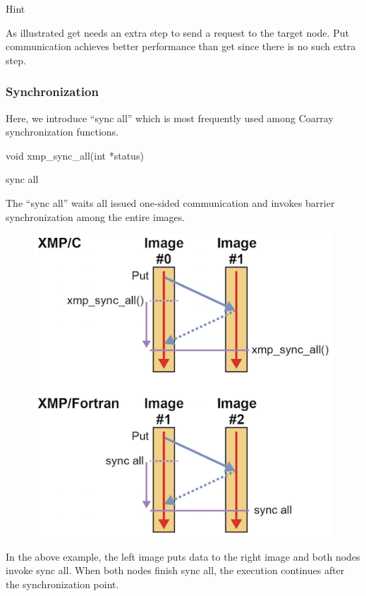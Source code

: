 Hint

As illustrated get needs an extra step to send a request to the target
node. Put communication achieves better performance than get since there
is no such extra step.

\subsubsection{Synchronization}

Here, we introduce “sync all” which is most frequently used among
Coarray synchronization functions.

\begin{XCexample}
void xmp_sync_all(int *status)
\end{XCexample}

\begin{XFexample}
sync all
\end{XFexample}

The “sync all” waits all issued one-sided communication and invokes
barrier synchronization among the entire images.

\begin{figure}
  \centering
  \includegraphics{figs/sync_all.png}
\end{figure}

In the above example, the left image puts data to the right image and
both nodes invoke sync all. When both nodes finish sync all, the
execution continues after the synchronization point.


